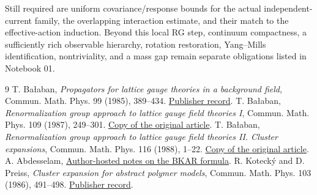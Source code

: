 \documentclass[11pt]{article}
\theoremstyle{remark}
\begin{document}
Still required are uniform covariance/response bounds for the actual
independent-current family, the overlapping interaction estimate, and
their match to the effective-action induction. Beyond this local RG
step, continuum compactness, a sufficiently rich observable hierarchy,
rotation restoration, Yang--Mills identification, nontriviality, and
a mass gap remain separate obligations listed in Notebook 01.

\begin{thebibliography}{9}
 T. Ba\l aban,
\emph{Propagators for lattice gauge theories in a background field},
Commun. Math. Phys. 99 (1985), 389--434.
\href{https://doi.org/10.1007/BF01240355}{Publisher record}.
 T. Ba\l aban,
\emph{Renormalization group approach to lattice gauge field theories I},
Commun. Math. Phys. 109 (1987), 249--301.
\href{https://scispace.com/pdf/renormalization-group-approach-to-lattice-gauge-field-3ygai0vxt1.pdf}
{Copy of the original article}.
 T. Ba\l aban,
\emph{Renormalization group approach to lattice gauge field theories II.
Cluster expansions}, Commun. Math. Phys. 116 (1988), 1--22.
\href{https://scispace.com/pdf/renormalization-group-approach-to-lattice-gauge-field-4penm4k7hc.pdf}
{Copy of the original article}.
 A. Abdesselam,
\href{https://mabdesselam.github.io/BKAR.pdf}{Author-hosted notes on the BKAR formula}.
 R. Koteck\'y and D. Preiss,
\emph{Cluster expansion for abstract polymer models},
Commun. Math. Phys. 103 (1986), 491--498.
\href{https://doi.org/10.1007/BF01211762}{Publisher record}.
\end{thebibliography}
\end{document}
